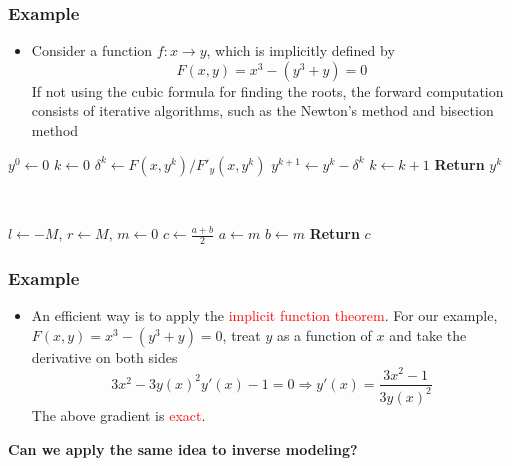 \documentclass{beamer}
\begin{document}
\begin{frame}
	\frametitle{Example}
	
\begin{itemize}
	\item Consider a function $f:x\rightarrow y$, which is implicitly defined by 
	$$F(x,y) = x^3 - (y^3+y) = 0$$
If not using the cubic formula for finding the roots, the forward computation consists of iterative algorithms, such as the Newton's method and bisection method
\end{itemize}



\begin{minipage}[t]{0.48\textwidth}
\centering
\begin{algorithmic}
\State $y^0 \gets 0$
\State $k \gets 0$
\State $\delta^k \gets F(x, y^k)/F'_y(x,y^k)$
\State $y^{k+1}\gets y^k - \delta^k$
\State $k \gets k+1$
\EndWhile
\State \textbf{Return} $y^k$
\end{algorithmic}
\end{minipage}~
\begin{minipage}[t]{0.48\textwidth}
\centering
\begin{algorithmic}
\State $l \gets -M$, $r\gets M$, $m\gets 0$
\State $c \gets \frac{a+b}{2}$
\State $a\gets m$
\Else
\State $b\gets m$
\EndIf
\EndWhile
\State \textbf{Return} $c$
\end{algorithmic}

\end{minipage}	

\end{frame}

\begin{frame}
	\frametitle{Example}
	
	\begin{itemize}
		\item An efficient way is to apply the \textcolor{red}{implicit function theorem}. For our example, $F(x,y)=x^3-(y^3+y)=0$, treat $y$ as a function of $x$ and take the derivative on both sides
		$$3x^2 - 3y(x)^2y'(x)-1=0\Rightarrow y'(x) = \frac{3x^2-1}{3y(x)^2}$$
	The above gradient is \textcolor{red}{exact}.
	\end{itemize}
	\begin{center}
			\textbf{Can we apply the same idea to inverse modeling?}
	\end{center}

\end{frame}
\end{document}
